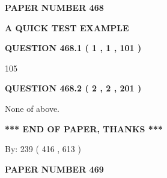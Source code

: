 \documentclass[12pt]{article}
\begin{document}
   
   
   
\newpage 
\setcounter{page}{ 
   468001 } 
   
   
   
   
 {\textbf{ \Large{ PAPER NUMBER  468  }}}
   
   
\vspace{0.2in}
   
   
   
   
   
   
 \vspace{0.2in}
{\LARGE {\textbf{ A QUICK TEST EXAMPLE}}}
   
   
  
\vspace{0.2in}
  
{\textbf{\Large{QUESTION
468.1 
 ( 1 , 1 , 101 )
}}}
  
  
 
 
\noindent{}

105
 
 
  
\vspace{0.2in}
  
{\textbf{\Large{QUESTION
468.2 
 ( 2 , 2 , 201 )
}}}
  
  
 
 
\noindent{}
 
 
 None of above.
 
 
 
 
   
   
 \vspace{0.2in}
 
   
   
   
   
\vspace{1.0in} 
{\textbf{\large{ *** END OF PAPER, THANKS *** }}} 
   
   
\hspace{1.0in} By: 
 239 ( 416 ,  613 )
   
   
   
   
\newpage 
\setcounter{page}{ 
   469001 } 
   
   
   
   
 {\textbf{ \Large{ PAPER NUMBER  469  }}}
   
\end{document}
